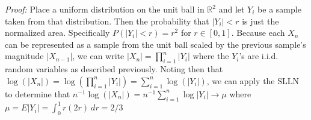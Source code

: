 \documentclass[10pt]{article}
\begin{document}
\textit{Proof:} Place a uniform distribution on the unit ball
in $\mathbb{R}^2$ and let $Y_i$ be a sample taken from that distribution.
Then the probability that $\vert Y_i \vert < r$ is just the normalized area. 
Specifically $P(\vert Y_i \vert < r) = r^2$ for $r \in [0,1]$. 
Because each $X_n$ can be represented as a sample from the unit ball scaled by 
the previous sample's magnitude $\vert X_{n-1} \vert$,
we can write $\vert X_n \vert = \prod_{i=1}^n \vert Y_i \vert$ where the $Y_i$'s
are i.i.d. random variables as described previously.
Noting then that $\log(\vert X_n \vert) = \log (\prod_{i=1}^n \vert Y_i \vert)
= \sum_{i=1}^n \log(\vert Y_i \vert )$, we can apply the SLLN to determine that 
$n^{-1} \log(\vert X_n \vert) = n^{-1} \sum_{i=1}^n \log \vert Y_i \vert \to \mu$
where $\mu = E \vert Y_i \vert = \int_0^1 r (2r) \ dr = 2/3$
\end{document}
